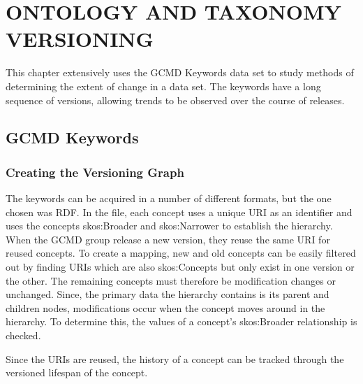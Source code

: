 
\chapter{ONTOLOGY AND TAXONOMY VERSIONING}

This chapter extensively uses the GCMD Keywords data set to study methods of determining the extent of change in a data set.
The keywords have a long sequence of versions, allowing trends to be observed over the course of releases.

\section{GCMD Keywords}

\subsection{Creating the Versioning Graph}

The keywords can be acquired in a number of different formats, but the one chosen was RDF.  In the file, each concept uses a unique URI as an identifier and uses the concepts skos:Broader and skos:Narrower to establish the hierarchy.  When the GCMD group release a new version, they reuse the same URI for reused concepts.  To create a mapping, new and old concepts can be easily filtered out by finding URIs which are also skos:Concepts but only exist in one version or the other.  The remaining concepts must therefore be modification changes or unchanged.  Since, the primary data the hierarchy contains is its parent and children nodes, modifications occur when the concept moves around in the hierarchy.  To determine this, the values of a concept's skos:Broader relationship is checked.

Since the URIs are reused, the history of a concept can be tracked through the versioned lifespan of the concept.

